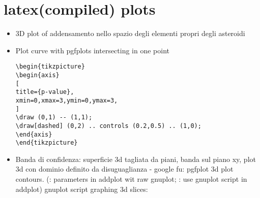 \section{latex(compiled) plots}

\begin{itemize}

\item 3D plot of addensamento nello spazio degli elementi propri degli asteroidi

\item Plot curve with pgfplots intersecting in one point
\begin{verbatim}
\begin{tikzpicture}
\begin{axis}
[
title={p-value},
xmin=0,xmax=3,ymin=0,ymax=3,
]
\draw (0,1) -- (1,1);
\draw[dashed] (0,2) .. controls (0.2,0.5) .. (1,0);
\end{axis}
\end{tikzpicture}
\end{verbatim}

\item Banda di confidenza: superficie 3d tagliata da piani, banda sul piano xy, plot 3d con dominio definito da disuguaglianza - google fu: pgfplot 3d plot contours. (\cite{tikzgnuplotparam}: parameters in addplot wit raw gnuplot; \cite{tikzgnuplotscript}: use gnuplot script in addplot)
gnuplot script graphing 3d slices:


\end{itemize}
